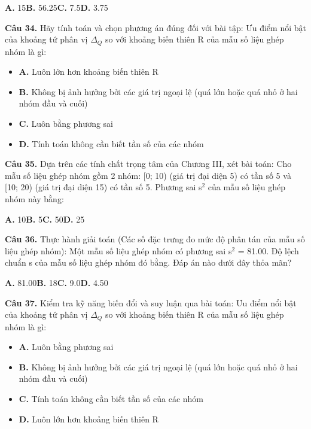 \documentclass[11pt,a4paper]{article}
\begin{document}
\hspace*{1.5em}\textbf{A.} 15\quad\quad \textbf{B.} 56.25\quad\quad \textbf{C.} 7.5\quad\quad \textbf{D.} 3.75\par\vspace{2pt}
\textbf{\color{primary} Câu 34.} Hãy tính toán và chọn phương án đúng đối với bài tập: Ưu điểm nổi bật của khoảng tứ phân vị $\Delta_Q$ so với khoảng biến thiên R của mẫu số liệu ghép nhóm là gì:\par
\begin{itemize}\setlength{\itemsep}{1pt}\setlength{\parskip}{0pt}
  \item[] \textbf{A.} Luôn lớn hơn khoảng biến thiên R
  \item[] \textbf{B.} Không bị ảnh hưởng bởi các giá trị ngoại lệ (quá lớn hoặc quá nhỏ ở hai nhóm đầu và cuối)
  \item[] \textbf{C.} Luôn bằng phương sai
  \item[] \textbf{D.} Tính toán không cần biết tần số của các nhóm
\end{itemize}\vspace{2pt}
\textbf{\color{primary} Câu 35.} Dựa trên các tính chất trọng tâm của Chương III, xét bài toán: Cho mẫu số liệu ghép nhóm gồm 2 nhóm: [0; 10) (giá trị đại diện 5) có tần số 5 và [10; 20) (giá trị đại diện 15) có tần số 5. Phương sai s$^2$ của mẫu số liệu ghép nhóm này bằng:\par
\hspace*{1.5em}\textbf{A.} 10\quad\quad \textbf{B.} 5\quad\quad \textbf{C.} 50\quad\quad \textbf{D.} 25\par\vspace{2pt}
\textbf{\color{primary} Câu 36.} Thực hành giải toán (Các số đặc trưng đo mức độ phân tán của mẫu số liệu ghép nhóm): Một mẫu số liệu ghép nhóm có phương sai s$^2$ = 81.00. Độ lệch chuẩn s của mẫu số liệu ghép nhóm đó bằng. Đáp án nào dưới đây thỏa mãn?\par
\hspace*{1.5em}\textbf{A.} 81.00\quad\quad \textbf{B.} 18\quad\quad \textbf{C.} 9.0\quad\quad \textbf{D.} 4.50\par\vspace{2pt}
\textbf{\color{primary} Câu 37.} Kiểm tra kỹ năng biến đổi và suy luận qua bài toán: Ưu điểm nổi bật của khoảng tứ phân vị $\Delta_Q$ so với khoảng biến thiên R của mẫu số liệu ghép nhóm là gì:\par
\begin{itemize}\setlength{\itemsep}{1pt}\setlength{\parskip}{0pt}
  \item[] \textbf{A.} Luôn bằng phương sai
  \item[] \textbf{B.} Không bị ảnh hưởng bởi các giá trị ngoại lệ (quá lớn hoặc quá nhỏ ở hai nhóm đầu và cuối)
  \item[] \textbf{C.} Tính toán không cần biết tần số của các nhóm
  \item[] \textbf{D.} Luôn lớn hơn khoảng biến thiên R
\end{itemize}\vspace{2pt}
\end{document}
